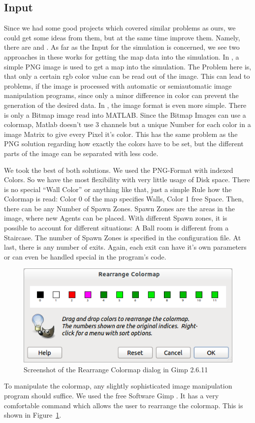 \documentclass[11pt]{article}
\begin{document}
\subsection{Input}
Since we had some good projects which covered similar problems as ours, we could get some ideas from them, but at the same time improve them.
Namely, there are \cite{multilevel} and \cite{airplane}. As far as the Input for the simulation is concerned, we see two approaches in these works for getting the map data into the simulation. In \cite{multilevel}, a simple PNG image is used to get a map into the simulation. The Problem here is, that only a certain rgb color value can be read out of the image.
This can lead to problems, if the image is processed with automatic or semiautomatic image manipulation programs, since only a minor difference in color can prevent the generation of the desired data.
In \cite{airplane}, the image format is even more simple. There is only a Bitmap image read into MATLAB. Since the Bitmap Images can use a colormap, Matlab doesn't use 3 channels but a unique Number for each color in a image Matrix to give every Pixel it's color.
This has the same problem as the PNG solution regarding how exactly the colors have to be set, but
the different parts of the image can be separated with less code.

We took the best of both solutions. We used the PNG-Format with indexed Colors.
So we have the most flexibility with very little usage of Disk space.
There is no special ``Wall Color'' or anything like that, just a simple Rule how the Colormap is read:
Color 0 of the map specifies Walls, Color 1 free Space. Then, there can be any Number of Spawn Zones.
Spawn Zones are the areas in the image, where new Agents can be placed. With different Spawn zones, it is possible to account for different situations: A Ball room is different from a Staircase. The number of Spawn Zones is specified in the configuration file. At last, there is any number of exits. Again, each exit can have it's own parameters or can even be handled special in the program's code. 

\begin{figure}[h]
	\centering
	\includegraphics[scale=0.5]{images/gimp.png}
	\caption{Screenshot of the Rearrange Colormap dialog in Gimp 2.6.11}
	\label{gimpscreenshot}
	
\end{figure}
To manipulate the colormap, any slightly sophisticated image manipulation program should suffice. We used the free Software Gimp \cite{gimp}. It has a very comfortable command which allows the user to rearrange the colormap. This is shown in Figure~\ref{gimpscreenshot}.
\end{document}
